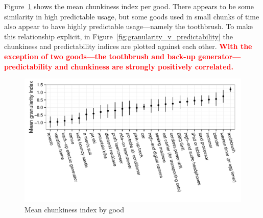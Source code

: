 \documentclass[11pt]{article}
\newcommand{\important}[1]{\textcolor{red}{\textbf{#1}}}
\newcommand{\important}[1]{#1}
\begin{document}
Figure~\ref{fig:granularity} shows the mean chunkiness index per good. 
There appears to be some similarity in high predictable usage, but some goods used in small chunks of time also appear to have highly predictable usage---namely the toothbrush. 
To make this relationship explicit, in Figure~\ref{fig:granularity_v_predictability} the chunkiness and predictability indices are plotted against each other. 
\important{With the exception of two goods---the toothbrush and back-up generator---predictability and chunkiness are strongly positively correlated.}

\begin{figure}
\centering 
\caption{Mean chunkiness index by good \label{fig:granularity}}
\begin{minipage}{0.90 \linewidth}
\includegraphics[width = \linewidth]{./plots/granularity.pdf} 
\end{minipage} 
\end{figure} 
\end{document}
